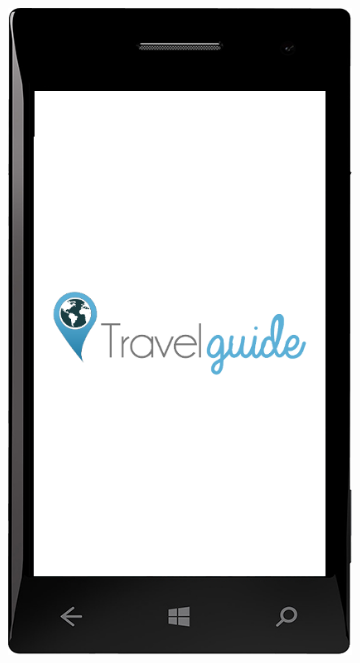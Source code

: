 \documentclass[a4paper]{book}
\begin{document}
		\begin{figure}[H]
			
			\begin{subfigure}{0.3\textwidth}
				\includegraphics[width=\textwidth]{screenshots/mobile/mobile1.png}					
				\caption{\label{subfig:mobile_splash}}
			\end{subfigure}
			\hfill
			\begin{subfigure}{0.3\textwidth}

\end{subfigure}
\end{figure}
\end{document}
